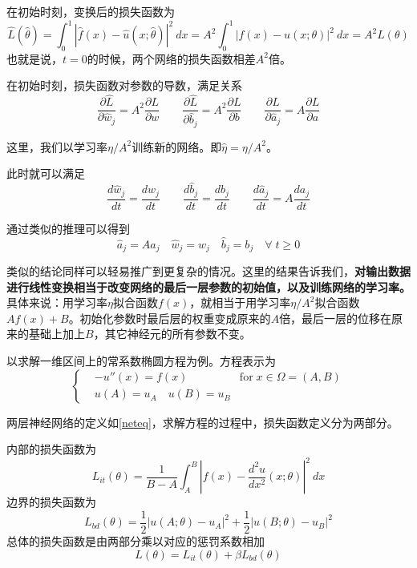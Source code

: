 在初始时刻，变换后的损失函数为
$$ \hat{L}(\hat{\theta}) = \int_{0}^{1} |\hat{f}(x) - \hat{u}(x; \hat{\theta})|^2 \ dx = A^2 \int_{0}^{1} |f(x) - u(x; \theta)|^2 \ dx = A^2 L(\theta) $$
也就是说，$t=0$的时候，两个网络的损失函数相差$A^2$倍。

在初始时刻，损失函数对参数的导数，满足关系
$$ \frac{\partial \hat{L}}{\partial \hat{w}_j} = A^2 \frac{\partial L}{\partial w} \qquad \frac{\partial \hat{L}}{\partial \hat{b}_j} = A^2 \frac{\partial L}{\partial b} \qquad \frac{\partial \hat{L}}{\partial \hat{a}_j} = A \frac{\partial L}{\partial a} $$

这里，我们以学习率$\eta / A^2$训练新的网络。即$\hat{\eta} = \eta / A^2$。

此时就可以满足
$$ \frac{d \hat{w}_j}{d t} = \frac{d w_j}{d t} \qquad \frac{d \hat{b}_j}{d t} = \frac{d b_j}{d t} \qquad \frac{d \hat{a}_j}{d t} = A \frac{d a_j}{d t} $$

通过类似的推理可以得到
$$ \hat{a}_j = A a_j \quad \hat{w}_j = w_j \quad \hat{b}_j = b_j \quad \forall \; t \geq 0 $$

类似的结论同样可以轻易推广到更复杂的情况。这里的结果告诉我们，\textbf{对输出数据进行线性变换相当于改变网络的最后一层参数的初始值，以及训练网络的学习率。}具体来说：用学习率$\eta$拟合函数$f(x)$，就相当于用学习率$\eta / A^2$拟合函数$Af(x)+B$。初始化参数时最后层的权重变成原来的$A$倍，最后一层的位移在原来的基础上加上$B$，其它神经元的所有参数不变。


以求解一维区间上的常系数椭圆方程为例。方程表示为
\begin{equation}\label{eqn}
\left\{
\begin{split}
& -u''(x) = f(x) & \text{for} \; x \in \Omega = (A, B) \\
& u(A) = u_A \quad u(B) = u_B
\end{split}
\right.
\end{equation}

两层神经网络的定义如\ref{neteq}，求解方程的过程中，损失函数定义分为两部分。

内部的损失函数为
\begin{equation}
L_{it}(\theta) = \frac{1}{B-A} \int_{A}^{B} |f(x) - \frac{d^2 u}{dx^2}(x; \theta)|^2 \ dx
\end{equation}
边界的损失函数为
\begin{equation}
L_{bd}(\theta) = \frac12 |u(A; \theta) - u_A|^2 + \frac12 |u(B; \theta) - u_B|^2
\end{equation}
总体的损失函数是由两部分乘以对应的惩罚系数相加
\begin{equation}
L(\theta) = L_{it}(\theta) + \beta L_{bd}(\theta)
\end{equation}

